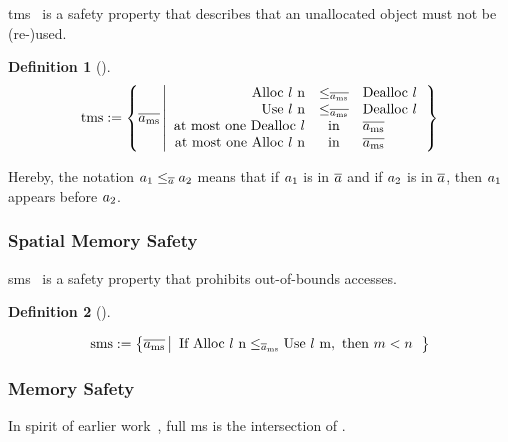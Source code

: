 \documentclass[dvipsnames,conference]{IEEEtran}
\theoremstyle{definition}
\newtheorem{definition}{Definition}[section]
\begin{document}
\gls*{tms}~\cite{nagarakatte2010cets} is a safety property that describes that an unallocated object must not be (re-)used.

\begin{definition}[]\label{def:trace:tmsdef}
  $$
  \tmssafe:=\left\{\trace[_{\mssafe}] \left| \begin{array}{rcl}
    \ev{Alloc\ \loc\ n}&\le_{\trace[_{\mssafe}]}&\ev{Dealloc\ \loc} \\
    \ev{Use\ \loc\ n}&\le_{\trace[_{\mssafe}]}&\ev{Dealloc\ \loc} \\
    \text{at most one }\ev{Dealloc\ \loc}&\text{in}&\trace[_{\mssafe}] \\
    \text{at most one }\ev{Alloc\ \loc\ n}&\text{in}&\trace[_{\mssafe}] \\
  \end{array}\right.\right\}
  $$
\end{definition}
Hereby, the notation $\event[_{1}]\le_{\trace}\event[_{2}]$ means that if $\event[_{1}]$ is in $\trace$ and if $\event[_{2}]$ is in $\trace$, then $\event[_{1}]$ appears before $\event[_{2}]$.

\subsubsection{Spatial Memory Safety}

\gls*{sms}~\cite{nagarakatte2009soft} is a safety property that prohibits out-of-bounds accesses.

\begin{definition}[]\label{def:trace:smsdef}

  \noindent
  \[
  \smssafe:=\left\{\trace[_{\mssafe}] \left|\begin{array}{rcl}
      \text{If }\ev{Alloc\ \loc\ n}\le_{\trace_{\mssafe}}\ev{Use\ \loc\ m}, \text{ then }m<n
  \end{array}\right.\right\}
  \]
\end{definition}

\subsubsection{Memory Safety}

In spirit of earlier work~\cite{nagarakatte2009soft,nagarakatte2010cets,jim2002cyclone,necula2005ccured,michael2023mswasm}, full \gls*{ms} is the intersection of .
\end{document}
